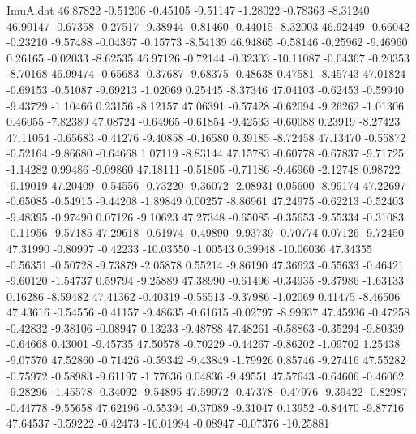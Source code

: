 \begin{filecontents}{ImuA.dat}
  46.87822   -0.51206   -0.45105   -9.51147   -1.28022   -0.78363   -8.31240
  46.90147   -0.67358   -0.27517   -9.38944   -0.81460   -0.44015   -8.32003
  46.92449   -0.66042   -0.23210   -9.57488   -0.04367   -0.15773   -8.54139
  46.94865   -0.58146   -0.25962   -9.46960    0.26165   -0.02033   -8.62535
  46.97126   -0.72144   -0.32303  -10.11087   -0.04367   -0.20353   -8.70168
  46.99474   -0.65683   -0.37687   -9.68375   -0.48638    0.47581   -8.45743
  47.01824   -0.69153   -0.51087   -9.69213   -1.02069    0.25445   -8.37346
  47.04103   -0.62453   -0.59940   -9.43729   -1.10466    0.23156   -8.12157
  47.06391   -0.57428   -0.62094   -9.26262   -1.01306    0.46055   -7.82389
  47.08724   -0.64965   -0.61854   -9.42533   -0.60088    0.23919   -8.27423
  47.11054   -0.65683   -0.41276   -9.40858   -0.16580    0.39185   -8.72458
  47.13470   -0.55872   -0.52164   -9.86680   -0.64668    1.07119   -8.83144
  47.15783   -0.60778   -0.67837   -9.71725   -1.14282    0.99486   -9.09860
  47.18111   -0.51805   -0.71186   -9.46960   -2.12748    0.98722   -9.19019
  47.20409   -0.54556   -0.73220   -9.36072   -2.08931    0.05600   -8.99174
  47.22697   -0.65085   -0.54915   -9.44208   -1.89849    0.00257   -8.86961
  47.24975   -0.62213   -0.52403   -9.48395   -0.97490    0.07126   -9.10623
  47.27348   -0.65085   -0.35653   -9.55334   -0.31083   -0.11956   -9.57185
  47.29618   -0.61974   -0.49890   -9.93739   -0.70774    0.07126   -9.72450
  47.31990   -0.80997   -0.42233  -10.03550   -1.00543    0.39948  -10.06036
  47.34355   -0.56351   -0.50728   -9.73879   -2.05878    0.55214   -9.86190
  47.36623   -0.55633   -0.46421   -9.60120   -1.54737    0.59794   -9.25889
  47.38990   -0.61496   -0.34935   -9.37986   -1.63133    0.16286   -8.59482
  47.41362   -0.40319   -0.55513   -9.37986   -1.02069    0.41475   -8.46506
  47.43616   -0.54556   -0.41157   -9.48635   -0.61615   -0.02797   -8.99937
  47.45936   -0.47258   -0.42832   -9.38106   -0.08947    0.13233   -9.48788
  47.48261   -0.58863   -0.35294   -9.80339   -0.64668    0.43001   -9.45735
  47.50578   -0.70229   -0.44267   -9.86202   -1.09702    1.25438   -9.07570
  47.52860   -0.71426   -0.59342   -9.43849   -1.79926    0.85746   -9.27416
  47.55282   -0.75972   -0.58983   -9.61197   -1.77636    0.04836   -9.49551
  47.57643   -0.64606   -0.46062   -9.28296   -1.45578   -0.34092   -9.54895
  47.59972   -0.47378   -0.47976   -9.39422   -0.82987   -0.44778   -9.55658
  47.62196   -0.55394   -0.37089   -9.31047    0.13952   -0.84470   -9.87716
  47.64537   -0.59222   -0.42473  -10.01994   -0.08947   -0.07376  -10.25881

\end{filecontents}
